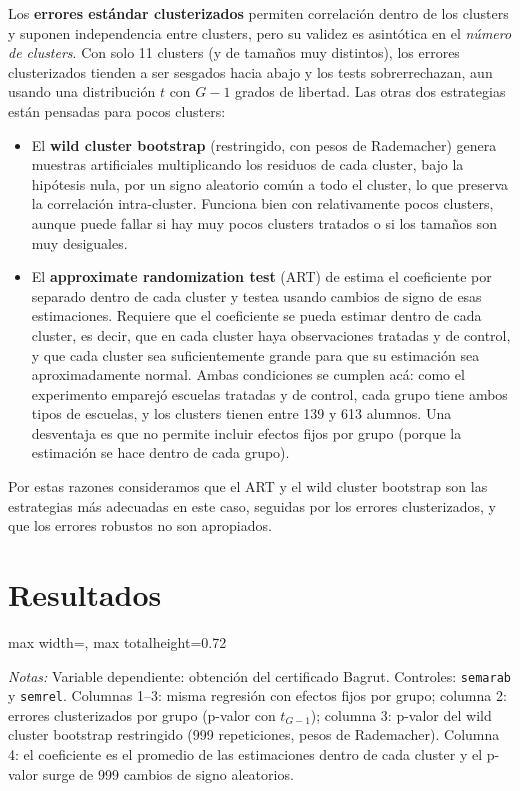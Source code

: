 \documentclass[11pt,a4paper]{article}
\newcommand{\tabla}[1]{\begin{adjustbox}{max width=\linewidth, max totalheight=0.72\textheight}\end{adjustbox}}
\newcommand{\notas}[1]{\par\vspace{0.3em}\begin{minipage}{0.92\linewidth}\footnotesize\textit{Notas:} #1\end{minipage}}
\begin{document}
Los \textbf{errores estándar clusterizados} permiten correlación dentro de los clusters y suponen independencia entre clusters, pero su validez es asintótica en el \emph{número de clusters}. Con solo 11 clusters (y de tamaños muy distintos), los errores clusterizados tienden a ser sesgados hacia abajo y los tests sobrerrechazan, aun usando una distribución $t$ con $G-1$ grados de libertad. Las otras dos estrategias están pensadas para pocos clusters:
\begin{itemize}
  \item El \textbf{wild cluster bootstrap} (restringido, con pesos de Rademacher) genera muestras artificiales multiplicando los residuos de cada cluster, bajo la hipótesis nula, por un signo aleatorio común a todo el cluster, lo que preserva la correlación intra-cluster. Funciona bien con relativamente pocos clusters, aunque puede fallar si hay muy pocos clusters tratados o si los tamaños son muy desiguales.
  \item El \textbf{approximate randomization test} (ART) de \citet{crs} estima el coeficiente por separado dentro de cada cluster y testea usando cambios de signo de esas estimaciones. Requiere que el coeficiente se pueda estimar dentro de cada cluster, es decir, que en cada cluster haya observaciones tratadas y de control, y que cada cluster sea suficientemente grande para que su estimación sea aproximadamente normal. Ambas condiciones se cumplen acá: como el experimento emparejó escuelas tratadas y de control, cada grupo tiene ambos tipos de escuelas, y los clusters tienen entre 139 y 613 alumnos. Una desventaja es que no permite incluir efectos fijos por grupo (porque la estimación se hace dentro de cada grupo).
\end{itemize}
Por estas razones consideramos que el ART y el wild cluster bootstrap son las estrategias más adecuadas en este caso, seguidas por los errores clusterizados, y que los errores robustos no son apropiados.

\section*{Resultados}

\begin{table}[H]\centering
\caption{Efecto del tratamiento sobre la obtención del Bagrut con distintas estrategias de inferencia}\label{tab:inf}
\tabla{"../output/Tabla 1.tex"}
\notas{Variable dependiente: obtención del certificado Bagrut. Controles: \texttt{semarab} y \texttt{semrel}. Columnas 1--3: misma regresión con efectos fijos por grupo; columna 2: errores clusterizados por grupo (p-valor con $t_{G-1}$); columna 3: p-valor del wild cluster bootstrap restringido (999 repeticiones, pesos de Rademacher). Columna 4: el coeficiente es el promedio de las estimaciones dentro de cada cluster y el p-valor surge de 999 cambios de signo aleatorios.}
\end{table}
\end{document}
